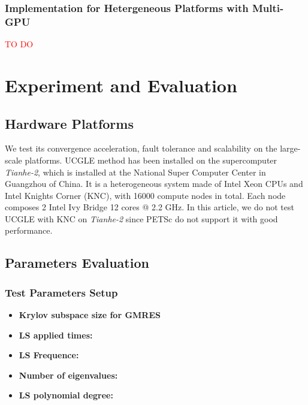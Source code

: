 \subsubsection{Implementation for Hetergeneous Platforms with Multi-GPU}

\textcolor{red}{TO DO}

\section{Experiment and Evaluation}

\subsection{Hardware Platforms}

We test its convergence acceleration, fault tolerance and scalability on the large-scale platforms. UCGLE method has been installed on the supercomputer \textit{Tianhe-2}, which is installed at the National Super Computer Center in Guangzhou of China. It is a heterogeneous system made of Intel Xeon CPUs and Intel Knights Corner (KNC), with 16000 compute nodes in total. Each node composes 2 Intel Ivy Bridge 12 cores @ 2.2 GHz. In this article, we do not test UCGLE with KNC on \textit{Tianhe-2} since PETSc do not support it with good performance.

\subsection{Parameters Evaluation}

\subsubsection{Test Parameters Setup}

\begin{itemize}
	\item \textbf{Krylov subspace size for GMRES }
	\item \textbf{LS applied times: }
	\item \textbf{LS Frequence:}
\end{itemize}

\begin{itemize}
	\item \textbf{Number of eigenvalues: }
\end{itemize}

\begin{itemize}
	\item \textbf{LS polynomial degree: }
\end{itemize}

